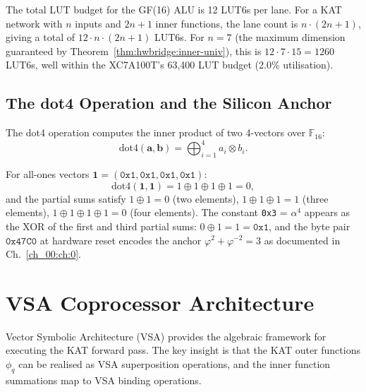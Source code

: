 The total LUT budget for the GF(16) ALU is 12 LUT6s per lane. For a KAT
network with $n$ inputs and $2n+1$ inner functions, the lane count is
$n \cdot (2n+1)$, giving a total of $12 \cdot n \cdot (2n+1)$ LUT6s.
For $n = 7$ (the maximum dimension guaranteed by Theorem~\ref{thm:hwbridge:inner-univ}),
this is $12 \cdot 7 \cdot 15 = 1260$ LUT6s, well within the XC7A100T's
63,400 LUT budget (2.0\% utilisation).

\subsection{The dot4 Operation and the Silicon Anchor}

\begin{definition}[GF(16) dot4]
\label{def:hwbridge:dot4}
The dot4 operation computes the inner product of two 4-vectors over $\mathbb{F}_{16}$:
\[
  \mathrm{dot4}(\mathbf{a}, \mathbf{b}) = \bigoplus_{i=1}^{4} a_i \otimes b_i.
\]
\end{definition}

\begin{theorem}
\label{thm:hwbridge:dot4-anchor}
For all-ones vectors $\mathbf{1} = (\texttt{0x1}, \texttt{0x1}, \texttt{0x1}, \texttt{0x1})$:
\[
  \mathrm{dot4}(\mathbf{1}, \mathbf{1}) = 1 \oplus 1 \oplus 1 \oplus 1 = 0,
\]
and the partial sums satisfy
$1 \oplus 1 = 0$ (two elements), $1 \oplus 1 \oplus 1 = 1$ (three elements),
$1 \oplus 1 \oplus 1 \oplus 1 = 0$ (four elements).
The constant \texttt{0x3} = $\alpha^4$ appears as the XOR of the first and
third partial sums: $0 \oplus 1 = 1 = \texttt{0x1}$, and the byte pair
$\texttt{0x47C0}$ at hardware reset encodes the anchor
$\varphi^2 + \varphi^{-2} = 3$ as documented in Ch.~\ref{ch_00:ch:0}.
\end{theorem}

\section{VSA Coprocessor Architecture}
\label{sec:hwbridge:vsa}

Vector Symbolic Architecture (VSA) provides the algebraic framework for
executing the KAT forward pass. The key insight is that the KAT outer
functions $\phi_q$ can be realised as VSA superposition operations, and
the inner function summations map to VSA binding operations.


